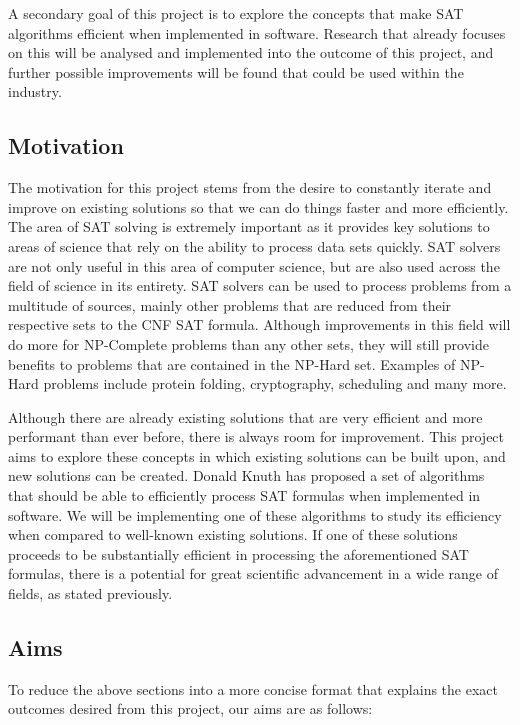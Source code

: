 \documentclass{article}
\begin{document}
A secondary goal of this project is to explore the concepts that make SAT algorithms efficient when implemented in software. Research that
already focuses on this will be analysed and implemented into the outcome of this project, and further possible improvements will be found
that could be used within the industry.

\newpage
\subsection{Motivation}
The motivation for this project stems from the desire to constantly iterate and improve on existing solutions so that we can do things
faster and more efficiently. The area of SAT solving is extremely important as it provides key solutions to areas of science that rely on
the ability to process data sets quickly. SAT solvers are not only useful in this area of computer science, but are also used across the
field of science in its entirety. SAT solvers can be used to process problems from a multitude of sources, mainly other problems that are
reduced from their respective sets to the CNF SAT formula. Although improvements in this field will do more for NP-Complete problems than
any other sets, they will still provide benefits to problems that are contained in the NP-Hard set. Examples of NP-Hard problems include
protein folding, cryptography, scheduling and many more.

Although there are already existing solutions that are very efficient and more performant than ever before, there is always room for
improvement. This project aims to explore these concepts in which existing solutions can be built upon, and new solutions can be created.
Donald Knuth has proposed a set of algorithms that should be able to efficiently process SAT formulas when implemented in software. We will
be implementing one of these algorithms to study its efficiency when compared to well-known existing solutions. If one of these solutions
proceeds to be substantially efficient in processing the aforementioned SAT formulas, there is a potential for great scientific advancement
in a wide range of fields, as stated previously.

\subsection{Aims}
To reduce the above sections into a more concise format that explains the exact outcomes desired from this project, our aims are as follows:
\end{document}
